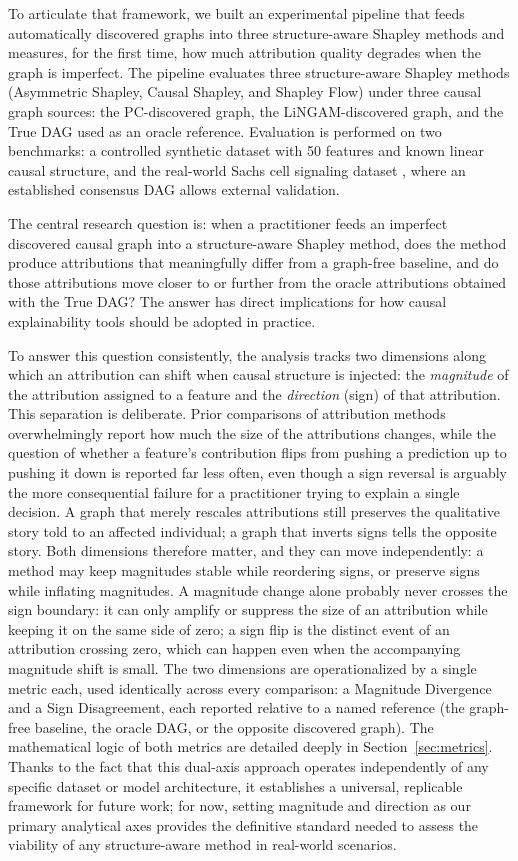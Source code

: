 \documentclass[12pt,a4paper,oneside]{article}
\begin{document}
To articulate that framework, we built an experimental pipeline that feeds automatically discovered graphs into three structure-aware Shapley methods and measures, for the first time, how much attribution quality degrades when the graph is imperfect. The pipeline evaluates three structure-aware Shapley methods (Asymmetric Shapley, Causal Shapley, and Shapley Flow) under three causal graph sources: the PC-discovered graph, the LiNGAM-discovered graph, and the True DAG used as an oracle reference. Evaluation is performed on two benchmarks: a controlled synthetic dataset with 50 features and known linear causal structure, and the real-world Sachs cell signaling dataset \citep{Sachs2005}, where an established consensus DAG allows external validation.

The central research question is: when a practitioner feeds an imperfect discovered causal graph into a structure-aware Shapley method, does the method produce attributions that meaningfully differ from a graph-free baseline, and do those attributions move closer to or further from the oracle attributions obtained with the True DAG? The answer has direct implications for how causal explainability tools should be adopted in practice.

To answer this question consistently, the analysis tracks two dimensions along which an attribution can shift when causal structure is injected: the \emph{magnitude} of the attribution assigned to a feature and the \emph{direction} (sign) of that attribution. This separation is deliberate. Prior comparisons of attribution methods overwhelmingly report how much the size of the attributions changes, while the question of whether a feature's contribution flips from pushing a prediction up to pushing it down is reported far less often, even though a sign reversal is arguably the more consequential failure for a practitioner trying to explain a single decision. A graph that merely rescales attributions still preserves the qualitative story told to an affected individual; a graph that inverts signs tells the opposite story. Both dimensions therefore matter, and they can move independently: a method may keep magnitudes stable while reordering signs, or preserve signs while inflating magnitudes. A magnitude change alone probably never crosses the sign boundary: it can only amplify or suppress the size of an attribution while keeping it on the same side of zero; a sign flip is the distinct event of an attribution crossing zero, which can happen even when the accompanying magnitude shift is small. The two dimensions are operationalized by a single metric each, used identically across every comparison: a Magnitude Divergence and a Sign Disagreement, each reported relative to a named reference (the graph-free baseline, the oracle DAG, or the opposite discovered graph). The mathematical logic of both metrics are detailed deeply in Section~\ref{sec:metrics}. Thanks to the fact that this dual-axis approach operates independently of any specific dataset or model architecture, it establishes a universal, replicable framework for future work; for now, setting magnitude and direction as our primary analytical axes provides the definitive standard needed to assess the viability of any structure-aware method in real-world scenarios.
\end{document}
